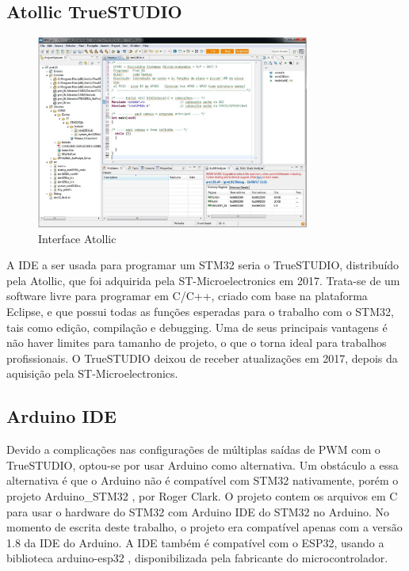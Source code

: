 \subsection{Atollic TrueSTUDIO}

\begin{figure}[ht]
	\centering
	\includegraphics[width=0.8\textwidth]{figures/atollic}
	\caption{Interface Atollic \cite{apostila_microprossados}}
\end{figure}

A IDE a ser usada para programar um STM32 seria o TrueSTUDIO, distribuído pela
Atollic, que foi adquirida pela ST-Microelectronics em 2017. Trata-se de um
software livre para programar em C/C++, criado com base na plataforma Eclipse,
e que possui todas as funções esperadas para o trabalho com o STM32, tais como
edição, compilação e debugging. Uma de seus principais vantagens é não haver
limites para tamanho de projeto, o que o torna ideal para trabalhos
profissionais. O TrueSTUDIO deixou de receber atualizações em 2017,
depois da aquisição pela ST-Microelectronics.\cite{apostila_microprossados}



\subsection{Arduino IDE}

Devido a complicações nas configurações de múltiplas saídas de PWM com o
TrueSTUDIO, optou-se por usar Arduino como alternativa. Um obstáculo a essa
alternativa é que o Arduino não é compatível com STM32 nativamente,
porém o projeto Arduino\_STM32 \cite{arduino_stm32}, por Roger Clark.
O projeto contem os arquivos em C para usar o hardware do STM32 com Arduino IDE
do STM32 no Arduino. No momento de escrita deste trabalho, o projeto era
compatível apenas com a versão 1.8 da IDE do Arduino.
A IDE também é compatível com o ESP32,  usando a biblioteca arduino-esp32 \cite{arduino_esp32}, 
disponibilizada pela fabricante do microcontrolador.

